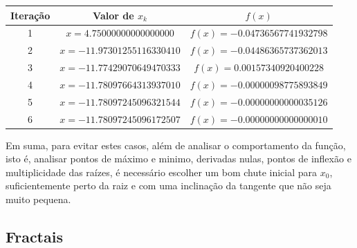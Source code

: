 \begin{center}
\small
\begin{tabular}{|c|c|c|}
\hline
Iteração & Valor de $x_k$ & $f(x)$ \\
\hline
1 & $x = 4.75000000000000000$ & $f(x) = -0.04736567741932798$ \\
\hline
2 & $x = -11.97301255116330410$ & $f(x) = -0.04486365737362013$ \\
\hline
3 & $x = -11.77429070649470333$ & $f(x) = 0.00157340920400228$ \\
\hline
4 & $x = -11.78097664313937010$ & $f(x) = -0.00000098775893849$ \\
\hline
5 & $x = -11.78097245096321544$ & $f(x) = -0.00000000000035126$ \\
\hline
6 & $x = -11.78097245096172507$ & $f(x) = -0.00000000000000010$ \\
\hline
\end{tabular}
\label{tab:ciladaNR}
\end{center}

Em suma, para evitar estes casos, além de analisar o comportamento da função, isto é, analisar pontos de máximo e minimo, derivadas nulas, pontos de inflexão e multiplicidade das raízes, é necessário escolher um bom chute inicial para $x_0$, suficientemente perto da raiz e com uma inclinação da tangente que não seja muito pequena.

\subsection{Fractais}

